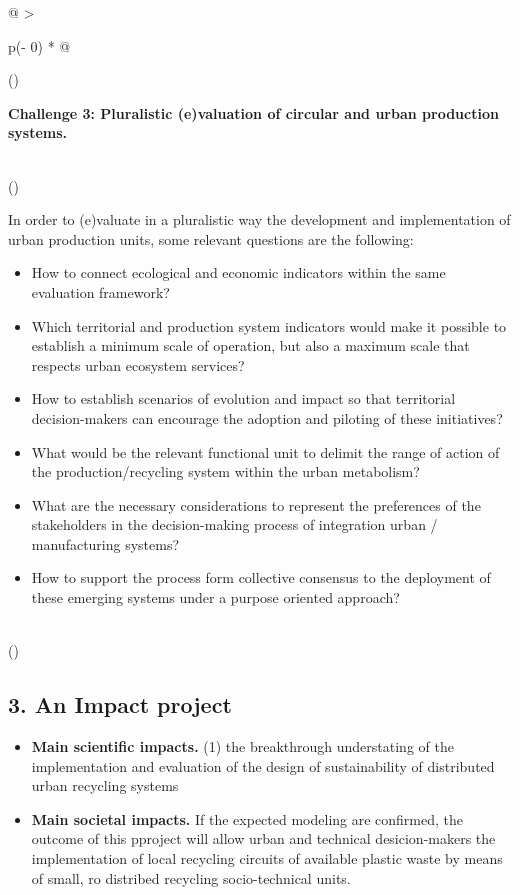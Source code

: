 \documentclass[
  12pt,
  a4paperpaper,
  onecolumn]{article}
\begin{document}
\begin{longtable}[]{@{}
  >{\raggedright\arraybackslash}p{(\columnwidth - 0\tabcolsep) * }@{}}
\toprule()
\begin{minipage}[b]{\linewidth}\raggedright
\textbf{Challenge 3: Pluralistic (e)valuation of circular and urban
production systems.}
\end{minipage} \\
\midrule()
\endhead
\begin{minipage}[t]{\linewidth}\raggedright
In order to (e)valuate in a pluralistic way the development and
implementation of urban production units, some relevant questions are
the following:

\begin{itemize}
\item
  How to connect ecological and economic indicators within the same
  evaluation framework?
\item
  Which territorial and production system indicators would make it
  possible to establish a minimum scale of operation, but also a maximum
  scale that respects urban ecosystem services?
\item
  How to establish scenarios of evolution and impact so that territorial
  decision-makers can encourage the adoption and piloting of these
  initiatives?
\item
  What would be the relevant functional unit to delimit the range of
  action of the production/recycling system within the urban metabolism?
\item
  What are the necessary considerations to represent the preferences of
  the stakeholders in the decision-making process of integration urban /
  manufacturing systems?
\item
  How to support the process form collective consensus to the deployment
  of these emerging systems under a purpose oriented approach?
\end{itemize}
\end{minipage} \\
\bottomrule()
\end{longtable}

\normalsize

\hypertarget{an-impact-project}{%
\subsection{3. An Impact project}\label{an-impact-project}}

\begin{itemize}
\item
  \textbf{Main scientific impacts.} (1) the breakthrough understating of
  the implementation and evaluation of the design of sustainability of
  distributed urban recycling systems
\item
  \textbf{Main societal impacts.} If the expected modeling are
  confirmed, the outcome of this pproject will allow urban and technical
  desicion-makers the implementation of local recycling circuits of
  available plastic waste by means of small, ro distribed recycling
  socio-technical units.
\end{itemize}
\end{document}
